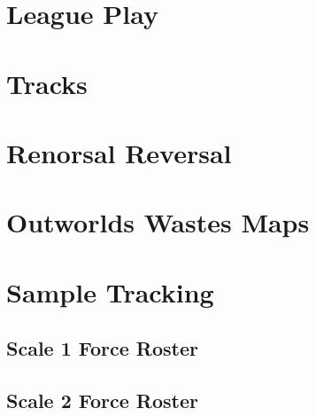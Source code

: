\documentclass{article}
\newcommand{\mysectiontitle}{}
\newcommand{\newsection}[2]{\renewcommand{\mysectiontitle}{#2}\section{#1}}
\begin{document}


\newpage

\newsection{League Play}{league-play}
\label{sec:league_play}



\newpage

\newsection{Tracks}{scenarios}
\label{sec:scenarios}



\newpage

\newsection{Renorsal Reversal}{short-story}



\newpage

\newsection{Outworlds Wastes Maps}{outworlds-wastes-map}
\label{sec:outworlds_wastes_map}





\newpage

\newsection{Sample Tracking}{sample-tracking}
\label{sec:sample_tracking}

\subsection{Scale 1 Force Roster}



\subsection{Scale 2 Force Roster}
\end{document}
